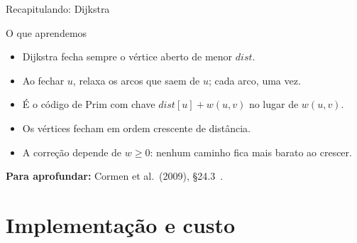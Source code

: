 \documentclass[aspectratio=169,xcolor=table]{beamer}
\newcommand{\fonte}[1]{%
  \vfill
  {\tiny\color{gray!55!black}\textbf{Para aprofundar:} #1\par}%
}
\begin{document}
\begin{frame}{Recapitulando: Dijkstra}
  \begin{block}{O que aprendemos}
    \begin{itemize}
      \item Dijkstra fecha sempre o vértice aberto de menor $\mathit{dist}$.
      \item Ao fechar $u$, relaxa os arcos que saem de $u$; cada arco, uma vez.
      \item É o código de Prim com chave $\mathit{dist}[u] + w(u,v)$ no lugar de $w(u,v)$.
      \item Os vértices fecham em ordem crescente de distância.
      \item A correção depende de $w \ge 0$: nenhum caminho fica mais barato ao crescer.
    \end{itemize}
  \end{block}
  \fonte{Cormen et al.\ (2009), \S 24.3~\cite{cormen2009introduction}.}
\end{frame}

\section{Implementação e custo}
\end{document}
